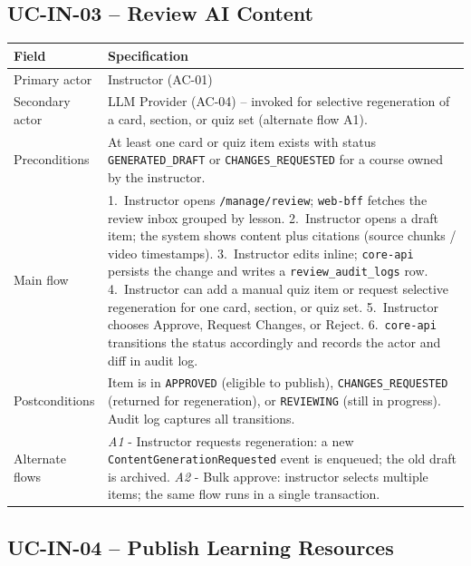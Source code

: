 \subsection*{UC-IN-03 -- Review AI Content}

\begin{longtable}{|p{3.2cm}|p{10.3cm}|}
\hline
\textbf{Field} & \textbf{Specification} \\
\hline
\endhead
Primary actor & Instructor (AC-01) \\
\hline
Secondary actor & LLM Provider (AC-04) -- invoked for selective
    regeneration of a card, section, or quiz set (alternate flow A1). \\
\hline
Preconditions & At least one card or quiz item exists with status
    \texttt{GENERATED\_DRAFT} or \texttt{CHANGES\_REQUESTED} for a
    course owned by the instructor. \\
\hline
Main flow &
    1.\ Instructor opens \texttt{/manage/review}; \texttt{web-bff}
    fetches the review inbox grouped by lesson.
    2.\ Instructor opens a draft item; the system shows content plus
    citations (source chunks / video timestamps).
    3.\ Instructor edits inline; \texttt{core-api} persists the change
    and writes a \texttt{review\_audit\_logs} row.
    4.\ Instructor can add a manual quiz item or request selective
    regeneration for one card, section, or quiz set.
    5.\ Instructor chooses Approve, Request Changes, or Reject.
    6.\ \texttt{core-api} transitions the status accordingly and
    records the actor and diff in audit log. \\
\hline
Postconditions & Item is in \texttt{APPROVED} (eligible to publish),
    \texttt{CHANGES\_REQUESTED} (returned for regeneration), or
    \texttt{REVIEWING} (still in progress). Audit log captures all
    transitions. \\
\hline
Alternate flows &
    \emph{A1} - Instructor requests regeneration: a new
    \texttt{ContentGenerationRequested} event is enqueued; the old
    draft is archived.
    \emph{A2} - Bulk approve: instructor selects multiple items; the
    same flow runs in a single transaction. \\
\hline
\end{longtable}

\subsection*{UC-IN-04 -- Publish Learning Resources}

